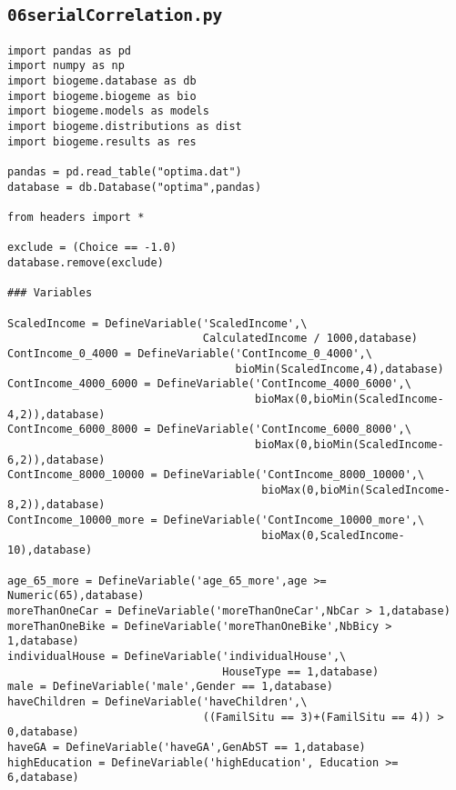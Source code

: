 \documentclass[12pt,a4paper]{article}
\begin{document}
\subsection{\lstinline$06serialCorrelation.py$}
\label{sec:06serialCorrelation}

\begin{lstlisting}[style=numbers]
import pandas as pd
import numpy as np
import biogeme.database as db
import biogeme.biogeme as bio
import biogeme.models as models
import biogeme.distributions as dist
import biogeme.results as res

pandas = pd.read_table("optima.dat")
database = db.Database("optima",pandas)

from headers import *

exclude = (Choice == -1.0)
database.remove(exclude)

### Variables

ScaledIncome = DefineVariable('ScaledIncome',\
                              CalculatedIncome / 1000,database)
ContIncome_0_4000 = DefineVariable('ContIncome_0_4000',\
                                   bioMin(ScaledIncome,4),database)
ContIncome_4000_6000 = DefineVariable('ContIncome_4000_6000',\
                                      bioMax(0,bioMin(ScaledIncome-4,2)),database)
ContIncome_6000_8000 = DefineVariable('ContIncome_6000_8000',\
                                      bioMax(0,bioMin(ScaledIncome-6,2)),database)
ContIncome_8000_10000 = DefineVariable('ContIncome_8000_10000',\
                                       bioMax(0,bioMin(ScaledIncome-8,2)),database)
ContIncome_10000_more = DefineVariable('ContIncome_10000_more',\
                                       bioMax(0,ScaledIncome-10),database)

age_65_more = DefineVariable('age_65_more',age >= Numeric(65),database)
moreThanOneCar = DefineVariable('moreThanOneCar',NbCar > 1,database)
moreThanOneBike = DefineVariable('moreThanOneBike',NbBicy > 1,database)
individualHouse = DefineVariable('individualHouse',\
                                 HouseType == 1,database)
male = DefineVariable('male',Gender == 1,database)
haveChildren = DefineVariable('haveChildren',\
                              ((FamilSitu == 3)+(FamilSitu == 4)) > 0,database)
haveGA = DefineVariable('haveGA',GenAbST == 1,database)
highEducation = DefineVariable('highEducation', Education >= 6,database)


\end{lstlisting}
\end{document}
